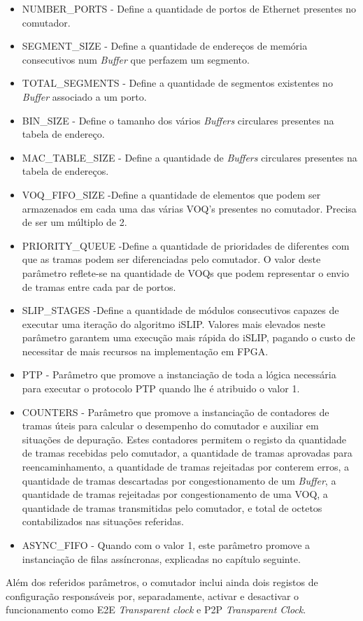 \begin{itemize}
  \item NUMBER\_PORTS  - \quad Define a quantidade de portos de Ethernet presentes no comutador. 
  \item SEGMENT\_SIZE  - \quad Define a quantidade de endereços de memória consecutivos num \textit{Buffer} que perfazem um segmento. 
  \item TOTAL\_SEGMENTS - \quad Define a quantidade de segmentos existentes no \textit{Buffer} associado a um porto.
  \item BIN\_SIZE - \quad Define o tamanho dos vários \textit{Buffers} circulares presentes na tabela de endereço.
  \item MAC\_TABLE\_SIZE - \quad Define a quantidade de \textit{Buffers} circulares presentes na tabela de endereços.
  \item VOQ\_FIFO\_SIZE -\quad Define a quantidade de elementos que podem ser armazenados em cada uma das várias VOQ's presentes no comutador. Precisa de ser um múltiplo de 2.
  \item PRIORITY\_QUEUE -\quad Define a quantidade de prioridades de diferentes com que as tramas podem ser diferenciadas pelo comutador. O valor deste parâmetro reflete-se na quantidade de VOQs que podem representar o envio de tramas entre cada par de portos.
  \item SLIP\_STAGES -\quad Define a quantidade de módulos consecutivos capazes de executar uma iteração do algoritmo iSLIP. Valores mais elevados neste parâmetro garantem uma execução mais rápida do iSLIP, pagando o custo de necessitar de mais recursos na implementação em FPGA.
  \item PTP - \quad Parâmetro que promove a instanciação de toda a lógica necessária para executar o protocolo PTP quando lhe é atribuido o valor 1. 
  \item COUNTERS - \quad Parâmetro que promove a instanciação de contadores de tramas úteis para calcular o desempenho do comutador e auxiliar em situações de depuração. Estes contadores permitem o registo da quantidade de tramas recebidas pelo comutador, a quantidade de tramas aprovadas para reencaminhamento, a quantidade de tramas rejeitadas por conterem erros, a quantidade de tramas descartadas por congestionamento de um \textit{Buffer}, a quantidade de tramas rejeitadas por congestionamento de uma VOQ, a quantidade de tramas transmitidas pelo comutador, e total de octetos contabilizados nas situações referidas. 
  \item ASYNC\_FIFO - \quad Quando com o valor 1, este parâmetro promove a instanciação de filas assíncronas, explicadas no capítulo seguinte.
\end{itemize}
  
Além dos referidos parâmetros, o comutador inclui ainda dois registos de configuração responsáveis por, separadamente, activar e desactivar o funcionamento como E2E \textit{Transparent clock} e P2P \textit{Transparent Clock}. 